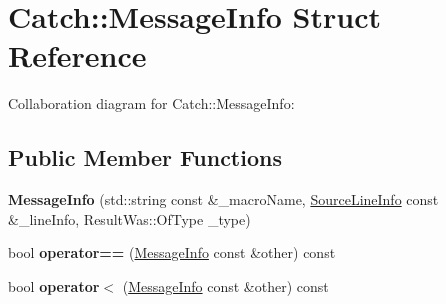 \hypertarget{struct_catch_1_1_message_info}{}\section{Catch\+:\+:Message\+Info Struct Reference}
\label{struct_catch_1_1_message_info}


Collaboration diagram for Catch\+:\+:Message\+Info\+:
\subsection*{Public Member Functions}
\begin{DoxyCompactItemize}
\item 
\hypertarget{struct_catch_1_1_message_info_a2e336c33ebef7af3c1bbae6a56e14f8a}{}{\bfseries Message\+Info} (std\+::string const \&\+\_\+macro\+Name, \hyperlink{struct_catch_1_1_source_line_info}{Source\+Line\+Info} const \&\+\_\+line\+Info, Result\+Was\+::\+Of\+Type \+\_\+type)\label{struct_catch_1_1_message_info_a2e336c33ebef7af3c1bbae6a56e14f8a}

\item 
\hypertarget{struct_catch_1_1_message_info_a30fe117138e568c5a9dfdabb7de6e790}{}bool {\bfseries operator==} (\hyperlink{struct_catch_1_1_message_info}{Message\+Info} const \&other) const \label{struct_catch_1_1_message_info_a30fe117138e568c5a9dfdabb7de6e790}

\item 
\hypertarget{struct_catch_1_1_message_info_a7a2b1ec3772cd35176e2ee25a94be16a}{}bool {\bfseries operator$<$} (\hyperlink{struct_catch_1_1_message_info}{Message\+Info} const \&other) const \label{struct_catch_1_1_message_info_a7a2b1ec3772cd35176e2ee25a94be16a}

\end{DoxyCompactItemize}
